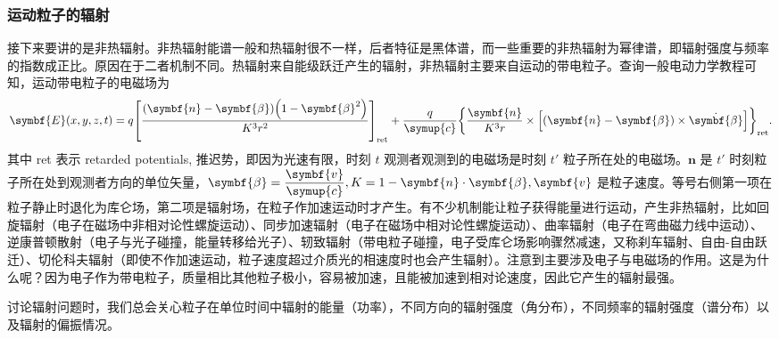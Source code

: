\documentclass[../天体物理基础.tex]{subfiles}
\begin{document}
\subsubsection{运动粒子的辐射}
接下来要讲的是非热辐射。非热辐射能谱一般和热辐射很不一样，后者特征是黑体谱，而一些重要的非热辐射为幂律谱，即辐射强度与频率的指数成正比。原因在于二者机制不同。热辐射来自能级跃迁产生的辐射，非热辐射主要来自运动的带电粒子。查询一般电动力学教程可知，运动带电粒子的电磁场为
\begin{equation}
\symbf{E}\mleft(x, y, z, t\mright)=q\mleft[\frac{\mleft(\symbf{n}-\symbf{\beta}\mright)\mleft(1-\symbf{\beta}^{2}\mright)}{K^{3}r^{2}}\mright]_{\mathrm{ret}}+\frac{q}{\symup{c}}\mleft\{\frac{\symbf{n}}{K^{3}r}\times\mleft[\mleft(\symbf{n}-\symbf{\beta}\mright)\times\dot{\symbf{\beta}}\mright]\mright\}_{\mathrm{ret}}.\label{1.3.38}
\end{equation}
其中 ret 表示 retarded potentials, 推迟势，即因为光速有限，时刻 $t$ 观测者观测到的电磁场是时刻 $t'$ 粒子所在处的电磁场。$\symbf{n}$ 是 $t'$ 时刻粒子所在处到观测者方向的单位矢量，$\symbf{\beta}=\dfrac{\symbf{v}}{\symup{c}}, K=1-\symbf{n}\cdot\symbf{\beta},\symbf{v}$ 是粒子速度。等号右侧第一项在粒子静止时退化为库仑场，第二项是辐射场，在粒子作加速运动时才产生。有不少机制能让粒子获得能量进行运动，产生非热辐射，比如回旋辐射（电子在磁场中非相对论性螺旋运动）、同步加速辐射（电子在磁场中相对论性螺旋运动）、曲率辐射（电子在弯曲磁力线中运动）、逆康普顿散射（电子与光子碰撞，能量转移给光子）、轫致辐射（带电粒子碰撞，电子受库仑场影响骤然减速，又称刹车辐射、自由{}-{}自由跃迁）、切伦科夫辐射（即使不作加速运动，粒子速度超过介质光的相速度时也会产生辐射）。注意到主要涉及电子与电磁场的作用。这是为什么呢？因为电子作为带电粒子，质量相比其他粒子极小，容易被加速，且能被加速到相对论速度，因此它产生的辐射最强。

讨论辐射问题时，我们总会关心粒子在单位时间中辐射的能量（功率），不同方向的辐射强度（角分布），不同频率的辐射强度（谱分布）以及辐射的偏振情况。
\end{document}
